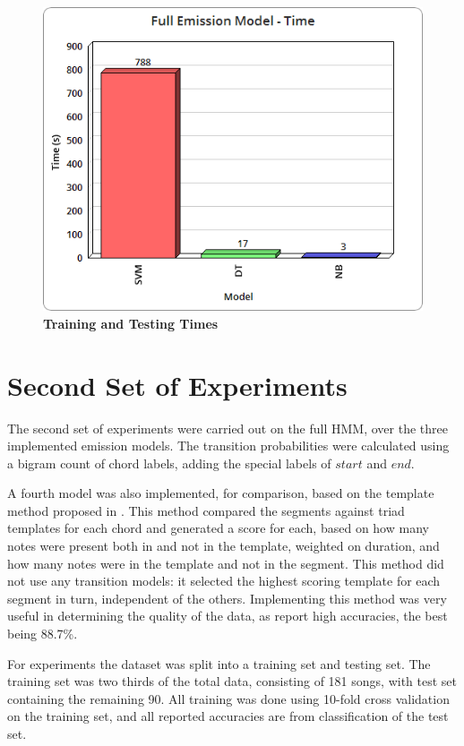 \documentclass[bsc,singlespacing,parskip,deptreport,twoside,frontabs]{infthesis}
\begin{document}
\begin{figure}
  \caption{\textbf{Training and Testing Times}}
  \centering
    \includegraphics[scale=0.5]{time}
\end{figure}


\section{Second Set of Experiments}

The second set of experiments were carried out on the full HMM, over the three implemented emission models. The transition probabilities were calculated using a bigram count of chord labels, adding the special labels of $start$ and $end$.

A fourth model was also implemented, for comparison, based on the template method proposed in \cite{pardo2002algorithms}. This method compared the segments against triad templates for each chord and generated a score for each, based on how many notes were present both in and not in the template, weighted on duration, and how many notes were in the template and not in the segment. This method did not use any transition models: it selected the highest scoring template for each segment in turn, independent of the others. Implementing this method was very useful in determining the quality of the data, as \cite{pardo2002algorithms} report high accuracies, the best being 88.7\%.

For experiments the dataset was split into a training set and testing set. The training set was two thirds of the total data, consisting of 181 songs, with test set containing the remaining 90. All training was done using 10-fold cross validation on the training set, and all reported accuracies are from classification of the test set.
\end{document}
